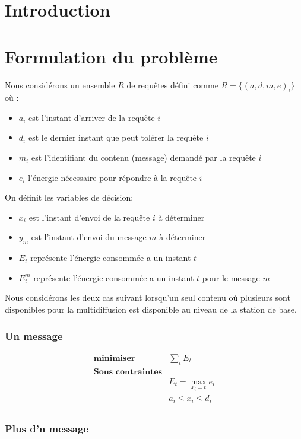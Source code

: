 \documentclass[runningheads]{llncs}
\begin{document}
\section{Introduction}
\section{Formulation du problème}
Nous considérons un ensemble $R$ de requêtes défini comme 
$R = \{(a, d, m, e )_i\} $ où :
\begin{itemize}
    \item $a_i$ est l'instant d'arriver de la requête $i$
    \item $d_i$ est le dernier instant que peut tolérer la requête $i$
    \item $m_i$ est l'identifiant du contenu (message) demandé par la requête  $i$
    \item $e_i$ l'énergie nécessaire pour répondre à la requête $i$
\end{itemize} 

On définit les variables de décision:
\begin{itemize}
    \item $x_i$ est l'instant d'envoi de la requête $i$ à  déterminer 
    \item $y_m$ est l'instant d'envoi du message  $m$ à  déterminer 
    \item $E_t$ représente l'énergie consommée a un instant $t$
    \item $E_t^m$ représente l'énergie consommée a un instant $t$ pour 
    le message $m$
\end{itemize}

Nous consid\'erons les deux cas suivant lorsqu'un seul contenu o\`u plusieurs 
sont disponibles pour la multidiffusion est disponible au niveau de la 
station de base.
\subsubsection{Un message}
\[
    \begin{array}{cc}
         \textbf{minimiser} &  \sum\limits_{t} E_t\\
         \textbf{Sous contraintes} & \\
         & E_t = \max\limits_{x_i=t} e_i \\
         & a_i \leq x_i \leq d_i\\
    \end{array}
\] 
\subsubsection{Plus d'n message}
\end{document}
